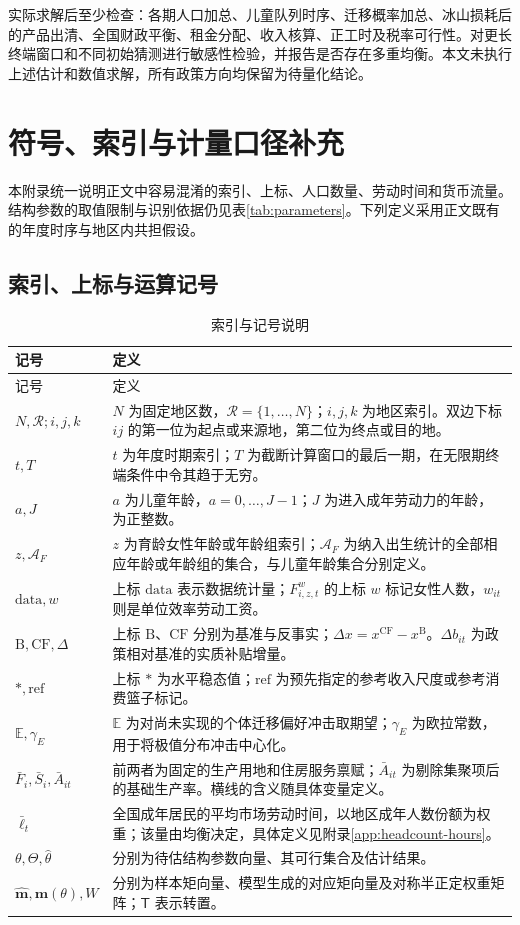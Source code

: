 \documentclass[UTF8,a4paper,zihao=-4,fontset=windows]{ctexart}
\numberwithin{equation}{section}
\newcommand{\E}{\mathbb E}
\newcommand{\B}{\mathrm B}
\newcommand{\CF}{\mathrm{CF}}
\begin{document}
实际求解后至少检查：各期人口加总、儿童队列时序、迁移概率加总、冰山损耗后的产品出清、全国财政平衡、租金分配、收入核算、正工时及税率可行性。对更长终端窗口和不同初始猜测进行敏感性检验，并报告是否存在多重均衡。本文未执行上述估计和数值求解，所有政策方向均保留为待量化结论。

\clearpage
\appendix

\section{符号、索引与计量口径补充}
\label{app:notation}

本附录统一说明正文中容易混淆的索引、上标、人口数量、劳动时间和货币流量。结构参数的取值限制与识别依据仍见表\ref{tab:parameters}。下列定义采用正文既有的年度时序与地区内共担假设。

\subsection{索引、上标与运算记号}
\small
\begin{longtable}{L{0.25\textwidth}L{0.65\textwidth}}
\caption{索引与记号说明}\label{tab:notation-conventions}\\
\toprule
记号 & 定义\\
\midrule
\endfirsthead
\toprule
记号 & 定义\\
\midrule
\endhead
\bottomrule
\endfoot
$N,\mathcal R;i,j,k$ & $N$ 为固定地区数，$\mathcal R=\{1,\ldots,N\}$；$i,j,k$ 为地区索引。双边下标 $ij$ 的第一位为起点或来源地，第二位为终点或目的地。\\
$t,T$ & $t$ 为年度时期索引；$T$ 为截断计算窗口的最后一期，在无限期终端条件中令其趋于无穷。\\
$a,J$ & $a$ 为儿童年龄，$a=0,\ldots,J-1$；$J$ 为进入成年劳动力的年龄，为正整数。\\
$z,\mathcal A_F$ & $z$ 为育龄女性年龄或年龄组索引；$\mathcal A_F$ 为纳入出生统计的全部相应年龄或年龄组的集合，与儿童年龄集合分别定义。\\
$\mathrm{data},w$ & 上标 $\mathrm{data}$ 表示数据统计量；$F^w_{i,z,t}$ 的上标 $w$ 标记女性人数，$w_{it}$ 则是单位效率劳动工资。\\
$\B,\CF,\Delta$ & 上标 $\B$、$\CF$ 分别为基准与反事实；$\Delta x=x^{\CF}-x^{\B}$。$\Delta b_{it}$ 为政策相对基准的实质补贴增量。\\
$*,\mathrm{ref}$ & 上标 $*$ 为水平稳态值；$\mathrm{ref}$ 为预先指定的参考收入尺度或参考消费篮子标记。\\
$\E,\gamma_E$ & $\E$ 为对尚未实现的个体迁移偏好冲击取期望；$\gamma_E$ 为欧拉常数，用于将极值分布冲击中心化。\\
$\bar F_i,\bar S_i,\bar A_{it}$ & 前两者为固定的生产用地和住房服务禀赋；$\bar A_{it}$ 为剔除集聚项后的基础生产率。横线的含义随具体变量定义。\\
$\bar\ell_t$ & 全国成年居民的平均市场劳动时间，以地区成年人数份额为权重；该量由均衡决定，具体定义见附录\ref{app:headcount-hours}。\\
$\theta,\Theta,\widehat\theta$ & 分别为待估结构参数向量、其可行集合及估计结果。\\
$\widehat{\bm m},\bm m(\theta),W$ & 分别为样本矩向量、模型生成的对应矩向量及对称半正定权重矩阵；$\mathsf T$ 表示转置。\\
\end{longtable}
\end{document}
